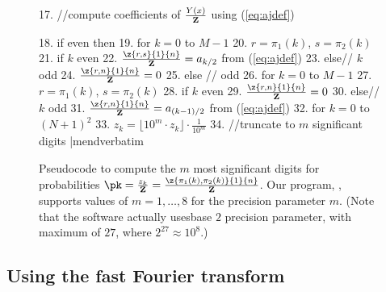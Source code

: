 \begin{figure}[!ht]
\begin{small}
17. //compute coefficients of $\frac{Y(x)}{{\bf Z}}$ using (\ref{eq:ajdef})


18. if \dBP{\strA}{\strB} even then
19.   for $k=0$ to $M-1$
20.     $r=\pi_1(k)$, $s=\pi_2(k)$
21.     if $k$ even
22.       $\frac{\z{r,s}{1}{n}}{{\bf Z}} = a_{k/2}$ from (\ref{eq:ajdef})
23.     else// $k$ odd
24.       $\frac{\z{r,n}{1}{n}}{{\bf Z}} = 0$
25. else // \dBP{\strA}{\strB} odd
26.   for $k=0$ to $M-1$
27.     $r=\pi_1(k)$, $s=\pi_2(k)$
28.     if $k$ even
29.       $\frac{\z{r,n}{1}{n}}{{\bf Z}} = 0$
30.     else// $k$ odd
31.       $\frac{\z{r,n}{1}{n}}{{\bf Z}} = a_{(k-1)/2}$ from (\ref{eq:ajdef})
32.  for $k=0$ to $(N+1)^2$
33.    $z_k = \lfloor 10^m \cdot z_k \rfloor \cdot \frac{1}{10^m}$
34.    //truncate to $m$ significant digits
|mendverbatim
\end{small}
\caption{\small
Pseudocode to compute the $m$ most significant digits
for probabilities
$\pk = \frac{z_{k}}{{\bf Z}}=\frac{\z{\pi_1(k),\pi_2(k)}{1}{n}}{{\bf Z}}$.
Our program, \ffttwo, supports values of $m = 1,\ldots,8$ for the
precision parameter $m$.
(Note that the software actually usesbase $2$ precision parameter, with maximum of $27$, where $2^{27} \approx
10^8$.)
}
\label{pseudocode:interpolatingP}
\end{figure}


\subsection{Using the fast Fourier transform}
\label{section:FFT}

